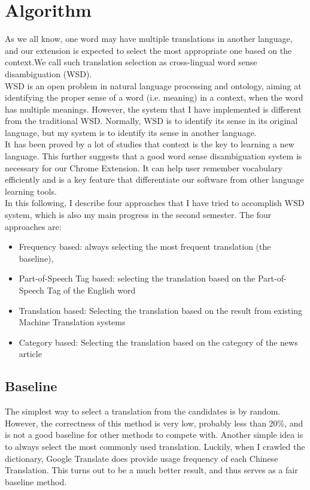 \section{Algorithm}
As we all know, one word may have multiple translations in another language, and our extension is expected to select the most appropriate one based on the context.We call such translation selection as cross-lingual word sense disambiguation (WSD).
\\
WSD is an open problem in natural language processing and ontology, aiming at identifying the proper sense of a word (i.e. meaning) in a context, when the word has multiple meanings. However, the system that I have implemented is  different from the traditional WSD. Normally, WSD is to identify its sense in its original language, but my system is to identify its sense in another language.
\\
It has been proved by a lot of studies that context is the key to learning a new language. This further suggests that a good word sense disambiguation system is necessary for our Chrome Extension. It can help user remember vocabulary efficiently and is a key feature that differentiate our software from other language learning tools.
\\
In this following, I describe four approaches that I have tried to accomplish WSD system, which is also my main progress in the second semester. The four approaches are: 
\begin{itemize}
\item Frequency based: always selecting the most frequent translation (the baseline),
\item Part-of-Speech Tag based: selecting the translation based on the Part-of-Speech Tag of the English word
\item Translation based: Selecting the translation based on the result from existing Machine Translation systems
\item Category based: Selecting the translation based on the category of the news article
\end{itemize}

\subsection{Baseline}
The simplest way to select a translation from the candidates is by random. However, the correctness of this method is very low, probably less than 20\%, and is not a good baseline for other methods to compete with. Another simple idea is to always select the most commonly used translation. Luckily, when I crawled the dictionary, Google Translate does provide usage frequency of each Chinese Translation.  This turns out to be a much better result, and thus serves as a fair baseline method.
\\
